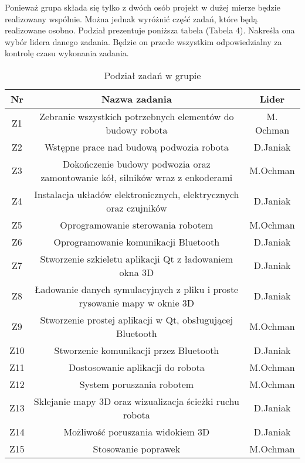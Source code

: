 Ponieważ grupa składa się tylko z dwóch osób projekt w dużej mierze będzie realizowany wspólnie. Można  jednak wyróżnić część zadań, które będą realizowane osobno. Podział prezentuje poniższa tabela (Tabela 4). Nakreśla ona wybór lidera danego zadania. Będzie on przede wszystkim odpowiedzialny za kontrolę czasu wykonania zadania.



\begin{table}[!htbp]
\begin{center}
\begin{tabular}{|c|c|c|}

\hline
\textbf{Nr} & \textbf{Nazwa zadania} & \textbf{Lider} \\ \hline\hline
Z1 & Zebranie wszystkich potrzebnych elementów do budowy robota & M. Ochman \\ \hline
Z2 & Wstępne prace nad budową podwozia robota & D.Janiak \\ \hline
Z3 & Dokończenie budowy podwozia oraz zamontowanie kół, silników wraz z enkoderami & M.Ochman \\ \hline
Z4 & Instalacja układów elektronicznych, elektrycznych oraz czujników & D.Janiak \\ \hline
Z5 & Oprogramowanie sterowania robotem & M.Ochman \\ \hline
Z6 & Oprogramowanie komunikacji Bluetooth & D.Janiak \\ \hline
Z7 & Stworzenie szkieletu aplikacji Qt z ładowaniem okna 3D & D.Janiak \\ \hline
Z8 & Ładowanie danych symulacyjnych z pliku i proste rysowanie mapy w oknie 3D & D.Janiak \\ \hline
Z9 & Stworzenie prostej aplikacji w Qt, obsługującej Bluetooth & M.Ochman \\ \hline
Z10 & Stworzenie komunikacji przez Bluetooth & D.Janiak \\ \hline
Z11 & Dostosowanie aplikacji do robota & M.Ochman \\ \hline
Z12 & System poruszania robotem & M.Ochman \\ \hline
Z13 & Sklejanie mapy 3D oraz wizualizacja ścieżki ruchu robota & D.Janiak \\ \hline
Z14 & Możliwość poruszania widokiem 3D & D.Janiak \\ \hline
Z15 & Stosowanie poprawek & M.Ochman \\ \hline

\end{tabular}
\caption{Podział zadań w grupie}
\end{center}
\end{table}

